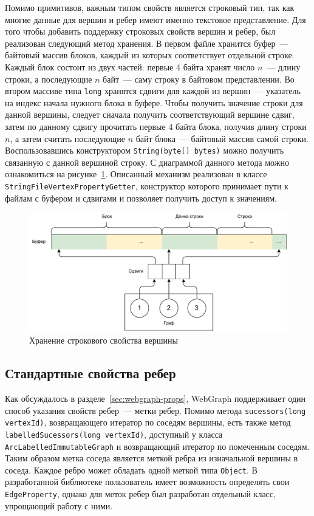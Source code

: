 \documentclass[times,specification,annotation]{itmo-student-thesis}
\begin{document}
Помимо примитивов, важным типом свойств является строковый тип, так как многие данные для вершин и ребер имеют именно текстовое представление. Для того чтобы добавить поддержку строковых свойств вершин и ребер, был реализован следующий метод хранения. В первом файле хранится буфер~--- байтовый массив блоков, каждый из которых соответствует отдельной строке. Каждый блок состоит из двух частей: первые 4 байта хранят число $n$~--- длину строки, а последующие $n$ байт~--- саму строку в байтовом представлении. Во втором массиве типа \texttt{long} хранятся сдвиги для каждой из вершин~--- указатель на индекс начала нужного блока в буфере. Чтобы получить значение строки для данной вершины, следует сначала получить соответствующий вершине сдвиг, затем по данному сдвигу прочитать первые 4 байта блока, получив длину строки $n$, а затем считать последующие $n$ байт блока~--- байтовый массив самой строки. Воспользовавшись конструктором \texttt{String(byte[] bytes)} можно получить связанную с данной вершиной строку. С диаграммой данного метода можно ознакомиться на рисунке~\ref{fig:blocks}. 
Описанный механизм реализован в классе \texttt{StringFileVertexPropertyGetter}, конструктор которого принимает пути к файлам с буфером и сдвигами и позволяет получить доступ к значениям.

\begin{figure}[!h]
\caption{Хранение строкового свойства вершины}\label{fig:blocks}
\centering
\includegraphics[width=\textwidth]{img/blocks.pdf}
\end{figure}

\subsection{Стандартные свойства ребер}

Как обсуждалось в разделе~\ref{sec:webgraph-props}, WebGraph поддерживает один способ указания свойств ребер~--- метки ребер. Помимо метода \texttt{sucessors(long vertexId)}, возвращающего итератор по соседям вершины, есть также метод \texttt{labelledSucessors(long vertexId)}, доступный у класса \texttt{ArcLabelledImmutableGraph} и возвращающий итератор по помеченным соседям. Таким образом метка соседа является меткой ребра из изначальной вершины в соседа. Каждое ребро может обладать одной меткой типа \texttt{Object}. В разработанной библиотеке пользователь имеет возможность определять свои \texttt{EdgeProperty}, однако для меток ребер был разработан отдельный класс, упрощающий работу с ними.
\end{document}
